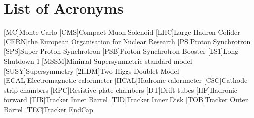 




\chapter*{List of Acronyms}
\begin{acronym}[CERN]
[MC]{Monte Carlo}
[CMS]{Compact Muon Solenoid}
[LHC]{Large Hadron Colider}
[CERN]{the European Organisation for Nuclear Research }
[PS]{Proton Synchrotron}
[SPS]{Super Proton Synchrotron}
[PSB]{Proton Synchrotron Booster}
[LS1]{Long Shutdown 1}
[MSSM]{Minimal Supersymmetric standard model}
[SUSY]{Supersymmetry}
[2HDM]{Two Higgs Doublet Model}
[ECAL]{Electromagnetic calorimeter}
[HCAL]{Hadronic calorimeter}
[CSC]{Cathode strip chambers}
[RPC]{Resistive plate chambers}
[DT]{Drift tubes}
[HF]{Hadronic forward}
[TIB]{Tracker Inner Barrel}
[TID]{Tracker Inner Disk}
[TOB]{Tracker Outer Barrel}
[TEC]{Tracker EndCap}
\end{acronym}


